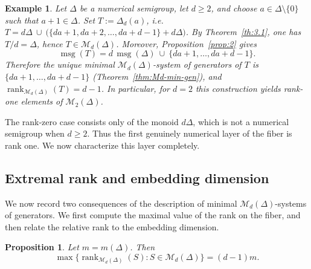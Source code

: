 \documentclass[12pt,a4paper]{amsart}
\newtheorem{proposition}[theorem]{Proposition}
\newtheorem{example}[theorem]{Example}
\theoremstyle{definition}
\theoremstyle{remark}
\begin{document}
\begin{example}\label{ex:Sda-rank}
Let $\Delta$ be a numerical semigroup, let $d\ge 2$, and choose $a\in\Delta\setminus\{0\}$ such that $a+1\in\Delta$.
Set $T:=\Delta_d(a)$, i.e. $T=d\Delta\ \cup\ \bigl(\{da+1,da+2,\dots,da+d-1\}+d\Delta\bigr)$. By Theorem~\ref{th:3.1}, one has $T/d=\Delta$, hence $T\in\mathcal{M}_d(\Delta)$.
Moreover, Proposition~\ref{prop:2} gives
\[
\operatorname{msg}(T)=d\,\operatorname{msg}(\Delta)\ \cup\ \{da+1,\dots,da+d-1\}.
\]
Therefore the unique minimal $\mathcal{M}_d(\Delta)$-system of generators of $T$ is $\{da+1,\dots,da+d-1\}$ (Theorem~\ref{thm:Md-min-gen}), and
$\operatorname{rank}_{\mathcal{M}_d(\Delta)}(T)=d-1$.
In particular, for $d=2$ this construction yields rank-one elements of $\mathcal{M}_2(\Delta)$.
\end{example}

The rank-zero case consists only of the monoid $d\Delta$, which is not a numerical
semigroup when $d\ge2$. Thus the first genuinely numerical layer of the fiber is rank
one. We now characterize this layer completely.

\subsection{Extremal rank and embedding dimension}

We now record two consequences of the description of minimal
\(\mathcal{M}_d(\Delta)\)-systems of generators. We first compute the maximal value of the rank on the fiber, and then relate the relative rank to the embedding dimension.

\begin{proposition}\label{prop:maxrank}
Let \(m=m(\Delta)\). Then
\[
\max\{\operatorname{rank}_{\mathcal{M}_d(\Delta)}(S): S\in
\mathcal{M}_d(\Delta)\}=(d-1)m.
\]
\end{proposition}
\end{document}
